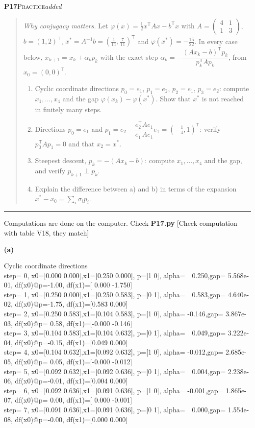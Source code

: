 \documentclass[11pt,a4paper]{article}
\newcommand{\T}{^{\mathsf T}}
\newcommand{\task}[3]{\par\medskip\noindent\textbf{#1}\quad\textsc{#2}\hfill\textit{#3}\par\smallskip}
\newenvironment{statement}{\begin{quote}\small}{\end{quote}\vspace{-0.3em}\noindent\textcolor{gray}{\rule{\linewidth}{0.6pt}}\par\medskip}
\newcommand{\console}[1]{\par\noindent\colorbox{codebg}{\parbox{\dimexpr\linewidth-2\fboxsep}{\color{white}\scriptsize\ttfamily #1}}\par}
\begin{document}
\task{P17}{Practice}{added}
\begin{statement}
\emph{Why conjugacy matters.} Let $\varphi(x)=\tfrac12 x\T Ax-b\T x$ with $A=\begin{pmatrix}4&1\\1&3\end{pmatrix}$, $b=(1,2)\T$, $x^*=A^{-1}b=(\tfrac{1}{11},\tfrac{7}{11})\T$ and $\varphi(x^*)=-\tfrac{15}{22}$.
In every case below, $x_{k+1}=x_k+\alpha_k p_k$ with the exact step $\alpha_k=-\dfrac{(Ax_k-b)\T p_k}{p_k\T A p_k}$, from $x_0=(0,0)\T$.
\begin{enumerate}[label=\alph*)]
\item Cyclic coordinate directions $p_0=e_1$, $p_1=e_2$, $p_2=e_1$, $p_3=e_2$: compute $x_1,\dots,x_4$ and the gap $\varphi(x_k)-\varphi(x^*)$. Show that $x^*$ is not reached in finitely many steps.
\item Directions $p_0=e_1$ and $p_1=e_2-\dfrac{e_2\T Ae_1}{e_1\T Ae_1}e_1=(-\tfrac14,1)\T$: verify $p_0\T Ap_1=0$ and that $x_2=x^*$.
\item Steepest descent, $p_k=-(Ax_k-b)$: compute $x_1,\dots,x_4$ and the gap, and verify $p_{k+1}\perp p_k$.
\item Explain the difference between a) and b) in terms of the expansion $x^*-x_0=\sum_i\sigma_i p_i$.
\end{enumerate}
\end{statement}

{\color{note}Computations are done on the computer. Check \textcolor{remark}{\textbf{P17.py}}
\textcolor{green!50!black}{[Check computation with table V18, they match]}}

\textbf{(a)}
\console{%
[ITEM A] Cyclic coordinate directions\\
step= 0, x0=[0.000 0.000],x1=[0.250 0.000], p=[1 0], alpha=\ \ 0.250,gap= 5.568e-01, df(x0)@p=-1.00, df(x1)=[ 0.000 -1.750]\\
step= 1, x0=[0.250 0.000],x1=[0.250 0.583], p=[0 1], alpha=\ \ 0.583,gap= 4.640e-02, df(x0)@p=-1.75, df(x1)=[0.583 0.000]\\
step= 2, x0=[0.250 0.583],x1=[0.104 0.583], p=[1 0], alpha= -0.146,gap= 3.867e-03, df(x0)@p= 0.58, df(x1)=[-0.000 -0.146]\\
step= 3, x0=[0.104 0.583],x1=[0.104 0.632], p=[0 1], alpha=\ \ 0.049,gap= 3.222e-04, df(x0)@p=-0.15, df(x1)=[0.049 0.000]\\
step= 4, x0=[0.104 0.632],x1=[0.092 0.632], p=[1 0], alpha= -0.012,gap= 2.685e-05, df(x0)@p= 0.05, df(x1)=[-0.000 -0.012]\\
step= 5, x0=[0.092 0.632],x1=[0.092 0.636], p=[0 1], alpha=\ \ 0.004,gap= 2.238e-06, df(x0)@p=-0.01, df(x1)=[0.004 0.000]\\
step= 6, x0=[0.092 0.636],x1=[0.091 0.636], p=[1 0], alpha= -0.001,gap= 1.865e-07, df(x0)@p= 0.00, df(x1)=[ 0.000 -0.001]\\
step= 7, x0=[0.091 0.636],x1=[0.091 0.636], p=[0 1], alpha=\ \ 0.000,gap= 1.554e-08, df(x0)@p=-0.00, df(x1)=[0.000 0.000]}
\end{document}
